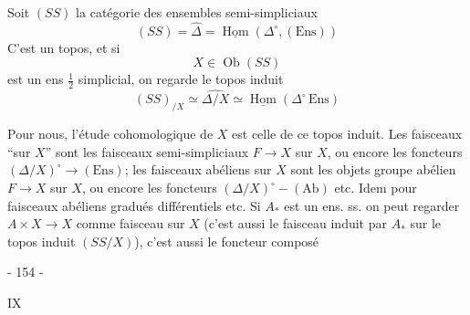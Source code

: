 

Soit $(SS)$ la catégorie des ensembles semi-simpliciaux
\[
(SS)=\widehat{\Delta}=\underline{\operatorname{Hom}}(\Delta^\circ,(\mathrm{Ens}))
\]
C'est un topos, et si
\[
X\in\operatorname{Ob}(SS)
\]
est un ens $\frac12$ simplicial, on regarde le topos induit
\[
(SS)_{/X}\simeq\widehat{\Delta/X}
\simeq\underline{\operatorname{Hom}}(\Delta^\circ\,\mathrm{Ens})
\]

Pour nous, l'étude cohomologique de $X$ est celle de ce topos induit. Les faisceaux  ``sur $X$'' sont les  faisceaux semi-simpliciaux  $F\longrightarrow X$ sur $X$, ou encore les foncteurs $(\Delta/X)^\circ\longrightarrow(\mathrm{Ens})$; les faisceaux abéliens sur $X$ sont les objets groupe abélien $F\longrightarrow X$ sur $X$, ou encore les foncteurs $(\Delta/X)^\circ\mathbin{-}(\mathrm{Ab})$ etc. Idem pour faisceaux abéliens gradués différentiels etc. Si $A_*$ est un ens. ss. on peut regarder $A\times X\longrightarrow X$ comme faisceau sur $X$ (c'est aussi le faisceau induit par $A_*$ sur le topos induit $(SS/X)$), c'est aussi le foncteur composé



\begin{center}- 154 -\end{center}
\begin{flushright}IX\end{flushright}


